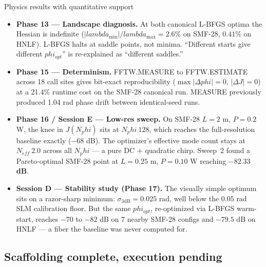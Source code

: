 \documentclass[11pt,letterpaper]{article}
\def\varphi{phi}%
\def\mathrm#1{#1}%
\def\lambda{lambda}%
\def\approx{~}%
\def\texttt#1{#1}%
\begin{document}
\begin{keyfinding}{Physics results with quantitative support}
\begin{itemize}[leftmargin=*]
  \item \textbf{Phase 13 --- Landscape diagnosis.} At both canonical L-BFGS optima the Hessian is indefinite ($|\lambda_{\min}|/\lambda_{\max} = 2.6\%$ on SMF-28, $0.41\%$ on HNLF). L-BFGS halts at saddle points, not minima. ``Different starts give different $\varphi_{\mathrm{opt}}$'' is re-explained as ``different saddles.''
  \item \textbf{Phase 15 --- Determinism.} \texttt{FFTW.MEASURE} to \texttt{FFTW.ESTIMATE} across 18 call sites gives bit-exact reproducibility ($\max|\Delta\varphi|=0$, $|\Delta J|=0$) at a 21.4\% runtime cost on the SMF-28 canonical run. MEASURE previously produced 1.04 rad phase drift between identical-seed runs.
  \item \textbf{Phase 16 / Session E --- Low-res sweep.} On SMF-28 $L=2$ m, $P=0.2$ W, the knee in $J(\mathrm{N}_\varphi)$ sits at $\mathrm{N}_\varphi \approx 128$, which reaches the full-resolution baseline exactly ($-68$ dB). The optimizer's effective mode count stays at $\mathrm{N}_{\mathrm{eff}} \approx 2.0$ across all $\mathrm{N}_\varphi$ --- a pure DC $+$ quadratic chirp. Sweep~2 found a Pareto-optimal SMF-28 point at $L = 0.25$ m, $P = 0.10$ W reaching \textbf{$-82.33$ dB}.
  \item \textbf{Session D --- Stability study (Phase 17).} The visually simple optimum sits on a razor-sharp minimum: $\sigma_{3\text{dB}} = 0.025$ rad, well below the $0.05$ rad SLM calibration floor. But the same $\varphi_{\mathrm{opt}}$, re-optimized via L-BFGS warm-start, reaches $-70$ to $-82$ dB on 7 nearby SMF-28 configs and $-79.5$ dB on HNLF --- a fiber the baseline was never computed for.
\end{itemize}
\end{keyfinding}

\subsection{Scaffolding complete, execution pending}
\end{document}
